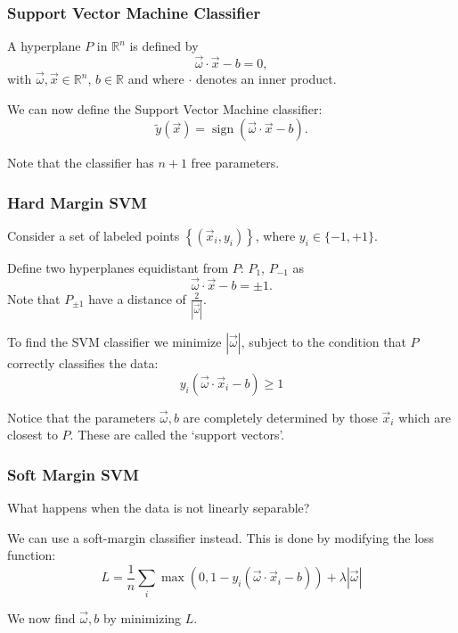 \documentclass[mathserif,serif]{beamer}
\begin{document}
\begin{frame}
  \frametitle{Support Vector Machine Classifier}
  A hyperplane $P$ in $\mathbb{R}^n$ is defined by
  \begin{equation}
    \vec{\omega} \cdot \vec{x} - b = 0,
  \end{equation}
  with $\vec{\omega}, \vec{x} \in \mathbb{R}^n$, $b \in \mathbb{R}$ and where $\cdot$ denotes an inner product.

  \pause
  We can now define the Support Vector Machine classifier:
  \begin{equation}
    \tilde{y}(\vec{x}) = \operatorname{sign}(\vec{\omega} \cdot \vec{x} - b).
  \end{equation}

  \pause
  Note that the classifier has $n+1$ free parameters.
\end{frame}

\begin{frame}
  \frametitle{Hard Margin SVM}
  Consider a set of labeled points $\left\{ (\vec x_i, y_i) \right\}$, where
  $y_i \in \{-1, +1\}$.

  \pause
  Define two hyperplanes equidistant from $P$: $P_1$, $P_{-1}$ as
  \begin{equation}
    \vec{\omega} \cdot \vec{x} - b = \pm 1.
  \end{equation}
  Note that $P_{\pm1}$ have a distance of $\frac{2}{|\vec{\omega}|}$.

  \pause
  To find the SVM classifier we minimize $|\vec{\omega}|$, subject to the condition that
  $P$ correctly classifies the data:
  \begin{equation}
    y_i(\vec\omega \cdot \vec x_i - b) \geq 1
  \end{equation}

  \pause
  Notice that the parameters $\vec \omega, b$ are completely determined by those
  $\vec x_i$ which are closest to $P$. These are called the `support vectors'.
\end{frame}

\begin{frame}
  \frametitle{Soft Margin SVM}
  What happens when the data is not linearly separable?

  \pause
  We can use a soft-margin classifier instead. This is done by modifying the
  loss function:
  \begin{equation}
    L = \frac 1n \sum_i \max(0, 1 - y_i(\vec\omega \cdot \vec x_i - b)) + \lambda |\vec\omega|
  \end{equation}

  \pause
  We now find $\vec\omega, b$ by minimizing $L$.
\end{frame}
\end{document}
